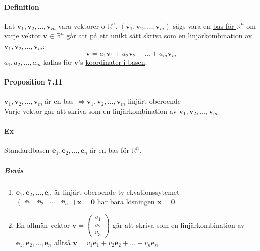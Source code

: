 \paragraph{Definition} Låt $\bm{v}_{1},\bm{v}_{2},\ldots,\bm{v}_{m}$  vara vektorer o $\mathbb{R}^{n}$. 
$(\bm{v}_{1},\bm{v}_{2},\ldots,\bm{v}_{m})$ sägs vara en \underline{bas för $\mathbb{R}^{n}$} om varje vektor $\bm{v}\in\mathbb{R}^{n}$ går att på ett unikt sätt skriva som en linjärkombination av $\bm{v}_{1},\bm{v}_{2},\ldots,\bm{v}_{m}$:
\begin{equation*}
    \bm{v}=a_{1}\bm{v}_{1}+a_{2}\bm{v}_{2}+\ldots+a_{m}\bm{v}_{m}
\end{equation*}
$a_{1},a_{2},\ldots,a_{m}$ kallas för $\bm{v}$'s \underline{koordinater i basen}.

\paragraph{Proposition 7.11} $\bm{v}_{1},\bm{v}_{2},\ldots,\bm{v}_{m}$ är en bas $\Leftrightarrow \bm{v}_{1},\bm{v}_{2},\ldots,\bm{v}_{m}$ linjärt oberoende\\
Varje vektor går att skriva som en linjärkombination av $\bm{v}_{1},\bm{v}_{2},\ldots,\bm{v}_{m}$

\paragraph{Ex} Standardbasen $\bm{e}_{1},\bm{e}_{2},\ldots,\bm{e}_{n}$ är en bas för $\mathbb{R}^{n}$.
\subparagraph{Bevis} 
\begin{enumerate}
    \item $\bm{e}_{1},\bm{e}_{2},\ldots,\bm{e}_{n}$ är linjärt oberoende ty ekvationssytemet $\begin{pmatrix}
        \bm{e}_{1}&\bm{e}_{2}&\ldots&\bm{e}_{n}
    \end{pmatrix}\bm{x}=\bm{0}$ har bara lösningen $\bm{x}=\bm{0}$.
    \item En allmän vektor $\bm{v}=\begin{pmatrix}v_{1}\\v_{2}\\v_{3}\end{pmatrix}$ 
    går att skriva som en linjärkombination av 
    $\bm{e}_{1},\bm{e}_{2},\ldots,\bm{e}_{n}$ alltså $\bm{v}=v_{1}\bm{e}_{1}+v_{2}\bm{e}_{2}+\ldots+v_{n}\bm{e}_{n}$
\end{enumerate}